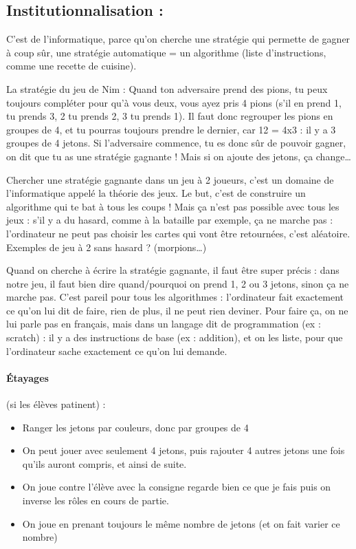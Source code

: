 \documentclass[12pt, a4paper]{article}
\begin{document}
\newpage
	
\subsection*{Institutionnalisation :}
	
	C’est de l’informatique, parce qu’on cherche une stratégie qui permette de gagner à coup sûr, une stratégie automatique = un algorithme (liste d’instructions, comme une recette de cuisine).
	
	La stratégie du jeu de Nim : Quand ton adversaire prend des pions, tu peux toujours compléter pour qu’à vous deux, vous ayez pris 4 pions (s’il en prend 1, tu prends 3, 2 tu prends 2, 3 tu prends 1). Il faut donc regrouper les pions en groupes de 4, et tu pourras toujours prendre le dernier, car 12 = 4x3 : il y a 3 groupes de 4 jetons. Si l’adversaire commence, tu es donc sûr de pouvoir gagner, on dit que tu as une stratégie gagnante ! Mais si on ajoute des jetons, ça change…
	
	Chercher une stratégie gagnante dans un jeu à 2 joueurs, c’est un domaine de l’informatique appelé la théorie des jeux. Le but, c’est de construire un algorithme qui te bat à tous les coups ! Mais ça n’est pas possible avec tous les jeux : s’il y a du hasard, comme à la bataille par exemple, ça ne marche pas : l’ordinateur ne peut pas choisir les cartes qui vont être retournées, c’est aléatoire. Exemples de jeu à 2 sans hasard ? (morpions…)
	
	Quand on cherche à écrire la stratégie gagnante, il faut être super précis : dans notre jeu, il faut bien dire quand/pourquoi on prend 1, 2 ou 3 jetons, sinon ça ne marche pas. C’est pareil pour tous les algorithmes : l’ordinateur fait exactement ce qu’on lui dit de faire, rien de plus, il ne peut rien deviner. Pour faire ça, on ne lui parle pas en français, mais dans un langage dit de programmation (ex : scratch) : il y a des instructions de base (ex : addition), et on les liste, pour que l’ordinateur sache exactement ce qu’on lui demande.
	
	\paragraph*{Étayages} (si les élèves patinent) :
	\begin{itemize}
		\item Ranger les jetons par couleurs, donc par groupes de 4
		\item On peut jouer avec seulement 4 jetons, puis rajouter 4 autres jetons une fois qu'ils auront compris,
		et ainsi de suite.
		\item On joue contre l'élève
		avec la consigne \og regarde bien ce que je fais\fg{}
		puis on inverse les rôles en cours de partie.
		\item On joue en prenant toujours le même nombre de jetons (et on fait varier ce nombre)
	\end{itemize}
	
\end{document}
